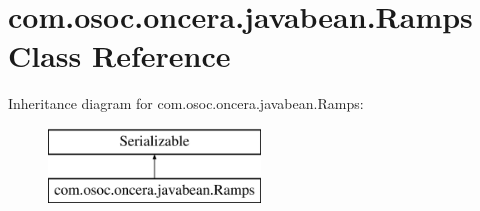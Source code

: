 \hypertarget{classcom_1_1osoc_1_1oncera_1_1javabean_1_1_ramps}{}\section{com.\+osoc.\+oncera.\+javabean.\+Ramps Class Reference}
\label{classcom_1_1osoc_1_1oncera_1_1javabean_1_1_ramps}
Inheritance diagram for com.\+osoc.\+oncera.\+javabean.\+Ramps\+:\begin{figure}[H]
\begin{center}
\leavevmode
\includegraphics[height=2.000000cm]{classcom_1_1osoc_1_1oncera_1_1javabean_1_1_ramps}
\end{center}
\end{figure}
